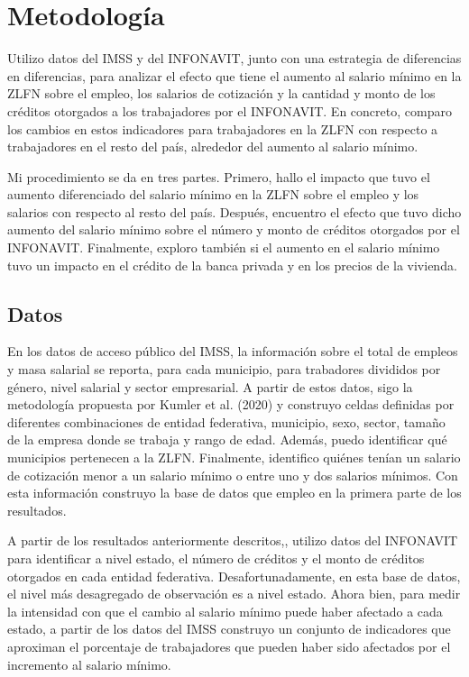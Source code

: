 \chapter{Metodología}
\label{ch:methodology}


\noindent Utilizo datos del IMSS y del INFONAVIT, junto con una estrategia de diferencias en diferencias, para analizar el efecto que tiene el aumento al salario mínimo en la ZLFN sobre el empleo, los salarios de cotización y la cantidad y monto de los créditos otorgados a los trabajadores por el INFONAVIT. En concreto, comparo los cambios en estos indicadores para trabajadores en la ZLFN con respecto a trabajadores en el resto del país, alrededor del aumento al salario mínimo.

	Mi procedimiento se da en tres partes. Primero, hallo el impacto que tuvo el aumento diferenciado del salario mínimo en la ZLFN sobre el empleo y los salarios con respecto al resto del país. Después, encuentro el efecto que tuvo dicho aumento del salario mínimo sobre el número y monto de créditos otorgados por el INFONAVIT. Finalmente, exploro también si el aumento en el salario mínimo tuvo un impacto en el crédito de la banca privada y en los precios de la vivienda.
	
\section{Datos}

\noindent En los datos de acceso público del IMSS, la información sobre el total de empleos y masa salarial se reporta, para cada municipio, para trabadores divididos por género, nivel salarial y sector empresarial. A partir de estos datos, sigo la metodología propuesta por Kumler et al. (2020) y construyo celdas definidas por diferentes combinaciones de entidad federativa, municipio, sexo, sector, tamaño de la empresa donde se trabaja y rango de edad. Además, puedo identificar qué municipios pertenecen a la ZLFN. Finalmente, identifico quiénes tenían un salario de cotización menor a un salario mínimo o entre uno y dos salarios mínimos. Con esta información construyo la base de datos que empleo en la primera parte de los resultados.

	A partir de los resultados anteriormente descritos,, utilizo datos del INFONAVIT para identificar a nivel estado, el número de créditos y el monto de créditos otorgados en cada entidad federativa. Desafortunadamente, en esta base de datos, el nivel más desagregado de observación es a nivel estado. Ahora bien, para medir la intensidad con que el cambio al salario mínimo puede haber afectado a cada estado, a partir de los datos del IMSS construyo un conjunto de indicadores que aproximan el porcentaje de trabajadores que pueden haber sido afectados por el incremento al salario mínimo.
	
